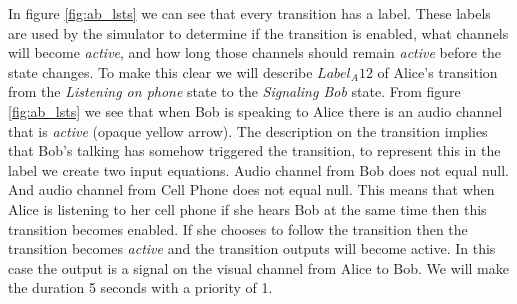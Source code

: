 In figure \ref{fig:ab_lsts} we can see that every transition has a label.  These labels are used by the simulator to determine if the transition is enabled, what channels will become {\em active}, and how long those channels should remain {\em active} before the state changes.  To make this clear we will describe $Label_A12$ of Alice's transition from the {\em Listening on phone} state to the {\em Signaling Bob} state.  From figure \ref{fig:ab_lsts} we see that when Bob is speaking to Alice there is an audio channel that is {\em active} (opaque yellow arrow).  The description on the transition implies that Bob's talking has somehow triggered the transition, to represent this in the label we create two input equations.  Audio channel from Bob does not equal null.  And audio channel from Cell Phone does not equal null.  This means that when Alice is listening to her cell phone if she hears Bob at the same time then this transition becomes enabled.  If she chooses to follow the transition then the transition becomes {\em active} and the transition outputs will become active.  In this case the output is a signal on the visual channel from Alice to Bob.  We will make the duration 5 seconds with a priority of 1.  

